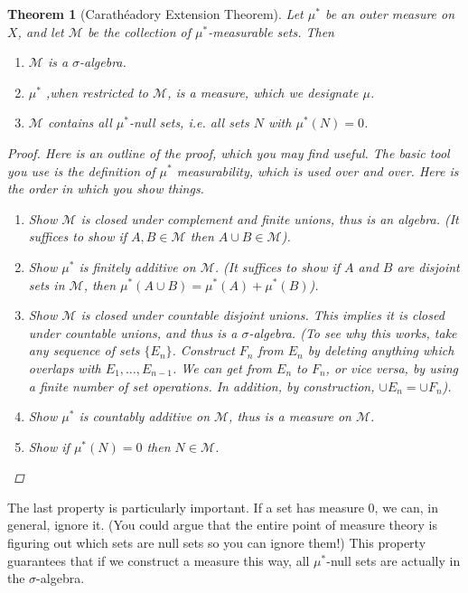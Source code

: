 \documentclass[12pt]{amsart}         %
\newtheorem{theorem}{Theorem}[section]
\theoremstyle{remark}
\begin{document}
\begin{theorem}[Carath\'{e}adory Extension Theorem]
Let $\mu^*$ be an outer measure on $X$, and let $\mathcal{M}$ be the collection of $\mu^*$-measurable sets. Then
\begin{enumerate}
    \item $\mathcal{M}$ is a $\sigma$-algebra.
    \item $\mu^*$ ,when restricted to $\mathcal{M}$, is a measure, which we designate $\mu$.
    \item $\mathcal{M}$ contains all $\mu^*$-null sets, i.e. all sets $N$ with $\mu^*(N) = 0$.
\end{enumerate}
\begin{proof}
Here is an outline of the proof, which you may find useful. The basic tool you use is the definition of $\mu^*$ measurability, which is used over and over. Here is the order in which you show things.
\begin{enumerate}
    \item Show $\mathcal{M}$ is closed under complement and finite unions, thus is an algebra. (It suffices to show if $A, B \in \mathcal{M}$ then $A \cup B \in \mathcal{M}$).
    \item Show $\mu^*$ is finitely additive on $\mathcal{M}$. (It suffices to show if $A$ and $B$ are disjoint sets in $\mathcal{M}$, then $\mu^*(A \cup B) = \mu^*(A) + \mu^*(B)$).
    \item Show $\mathcal{M}$ is closed under countable disjoint unions. This implies it is closed under countable unions, and thus is a $\sigma$-algebra. (To see why this works, take any sequence of sets $\{E_n\}$. Construct $F_n$ from $E_n$ by deleting anything which overlaps with $E_1, \dots, E_{n-1}$. We can get from $E_n$ to $F_n$, or vice versa, by using a finite number of set operations. In addition, by construction, $\cup E_n = \cup F_n$).
    \item Show $\mu^*$ is countably additive on $\mathcal{M}$, thus is a measure on $\mathcal{M}$.
    \item Show if $\mu^*(N) = 0$ then $N \in \mathcal{M}$.
\end{enumerate}
\end{proof}
\end{theorem}

The last property is particularly important. If a set has measure 0, we can, in general, ignore it. (You could argue that the entire point of measure theory is figuring out which sets are null sets so you can ignore them!) This property guarantees that if we construct a measure this way, all $\mu^*$-null sets are actually in the $\sigma$-algebra.
\end{document}

